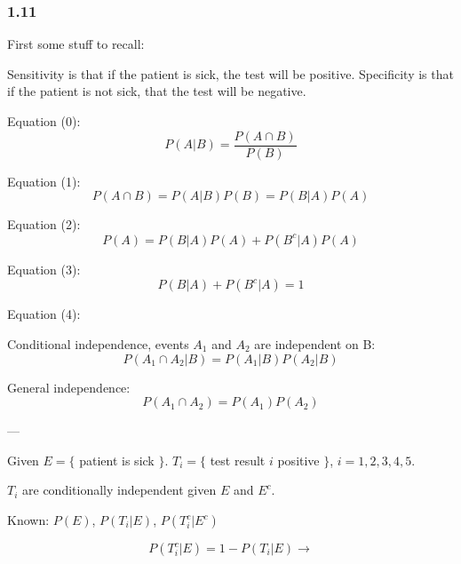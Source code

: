 \documentclass{report}
\begin{document}
\subsubsection*{1.11}

First some stuff to recall: 

 Sensitivity is that if the patient is sick, the test will be positive. Specificity is that if the patient is not sick, that the test will be negative.
 
Equation (0): $$P(A|B) = \frac{P(A \cap B)}{P(B)}$$ 

Equation (1): $$P(A \cap B) = P(A|B) P(B) = P(B|A) P(A)$$

Equation (2): $$P(A) = P(B|A) P(A) + P(B^c|A) P(A) $$

Equation (3): $$ P(B|A) +P(B^c|A) = 1 $$

Equation (4): 

Conditional independence, events $A_1$ and $A_2$ are independent on B: $$ P(A_1 \cap A_2 | B) = P(A_1 | B) P(A_2 |B) $$

General independence: $$P(A_1 \cap A_2) = P(A_1) P(A_2)$$

---

Given $E = \{$ patient is sick $\}$. $T_i = \{$ test result $i$ positive $\}$, $i=1,2,3,4,5$.

$T_i$ are conditionally independent given $E$ and $E^c$.

Known: $P(E)$, $P(T_i|E)$, $P(T_i^c|E^c)$

$$P(T_i^c|E) = 1-P(T_i|E) \rightarrow $$
\end{document}
